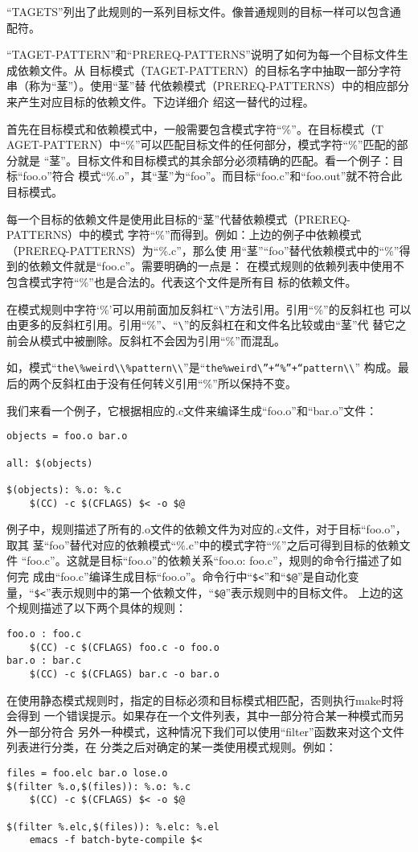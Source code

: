 “TAGETS”列出了此规则的一系列目标文件。像普通规则的目标一样可以包含通配符。

“TAGET-PATTERN”和“PREREQ-PATTERNS”说明了如何为每一个目标文件生成依赖文件。从
目标模式（TAGET-PATTERN）的目标名字中抽取一部分字符串（称为“茎”）。使用“茎”替
代依赖模式（PREREQ-PATTERNS）中的相应部分来产生对应目标的依赖文件。下边详细介
绍这一替代的过程。

首先在目标模式和依赖模式中，一般需要包含模式字符“\%”。在目标模式（T%
AGET-PATTERN）中“\%”可以匹配目标文件的任何部分，模式字符“\%”匹配的部分就是
“茎”。目标文件和目标模式的其余部分必须精确的匹配。看一个例子：目标“foo.o”符合
模式“\%.o”，其“茎”为“foo”。而目标“foo.c”和“foo.out”就不符合此目标模式。

每一个目标的依赖文件是使用此目标的“茎”代替依赖模式（PREREQ-PATTERNS）中的模式
字符“\%”而得到。例如：上边的例子中依赖模式（PREREQ-PATTERNS）为“\%.c”，那么使
用“茎”“foo”替代依赖模式中的“\%”得到的依赖文件就是“foo.c”。需要明确的一点是：
在模式规则的依赖列表中使用不包含模式字符“\%”也是合法的。代表这个文件是所有目
标的依赖文件。

在模式规则中字符‘\%’可以用前面加反斜杠“\verb"\"”方法引用。引用“\%”的反斜杠也
可以由更多的反斜杠引用。引用“\%”、“\verb"\"”的反斜杠在和文件名比较或由“茎”代
替它之前会从模式中被删除。反斜杠不会因为引用“\%”而混乱。

如，模式“\verb"the\%weird\\%pattern\\"”是“\verb"the%weird\”+“%”+“pattern\\"”
构成。最后的两个反斜杠由于没有任何转义引用“\%”所以保持不变。

我们来看一个例子，它根据相应的.c文件来编译生成“foo.o”和“bar.o”文件：

\begin{Verbatim}[]
objects = foo.o bar.o

all: $(objects)

$(objects): %.o: %.c
    $(CC) -c $(CFLAGS) $< -o $@
\end{Verbatim}

例子中，规则描述了所有的.o文件的依赖文件为对应的.c文件，对于目标“foo.o”，取其
茎“foo”替代对应的依赖模式“\%.c”中的模式字符“\%”之后可得到目标的依赖文件
“foo.c”。这就是目标“foo.o”的依赖关系“foo.o: foo.c”，规则的命令行描述了如何完
成由“foo.c”编译生成目标“foo.o”。命令行中“\verb"$<"”和“\verb"$@"”是自动化变
量，“\verb"$<"”表示规则中的第一个依赖文件，“\verb"$@"”表示规则中的目标文件。
上边的这个规则描述了以下两个具体的规则：
\begin{Verbatim}[]
foo.o : foo.c
    $(CC) -c $(CFLAGS) foo.c -o foo.o
bar.o : bar.c
    $(CC) -c $(CFLAGS) bar.c -o bar.o
\end{Verbatim}
在使用静态模式规则时，指定的目标必须和目标模式相匹配，否则执行make时将会得到
一个错误提示。如果存在一个文件列表，其中一部分符合某一种模式而另外一部分符合
另外一种模式，这种情况下我们可以使用“filter”函数来对这个文件列表进行分类，在
分类之后对确定的某一类使用模式规则。例如：
\begin{Verbatim}[]
files = foo.elc bar.o lose.o
$(filter %.o,$(files)): %.o: %.c
    $(CC) -c $(CFLAGS) $< -o $@

$(filter %.elc,$(files)): %.elc: %.el
    emacs -f batch-byte-compile $<
\end{Verbatim}

